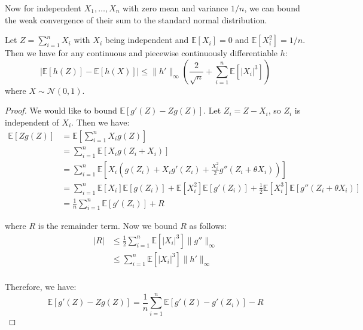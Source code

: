 \documentclass{article}
\begin{document}
Now for independent $X_1, \ldots, X_n$ with zero mean and variance $1/n$, we can bound the weak convergence of their sum to the standard normal distribution.  

\begin{theorem}
    Let $Z = \sum_{i=1}^{n} X_i$ with $X_i$ being independent and $\mathbb{E}[X_i]=0$ and $\mathbb{E}[X_i^2]=1/n$. Then we have for any continuous and piecewise continuously differentiable $h$:
    \begin{equation*}
        \left|\mathbb{E}[h(Z)] - \mathbb{E}[h(X)]\right| \leq \|h'\|_\infty \left( \frac{2}{\sqrt{n}} + \sum_{i=1}^{n} \mathbb{E}[|X_i|^3]\right)
    \end{equation*}
    where $X\sim \mathcal{N}(0,1)$.
\end{theorem}

\begin{proof}
    We would like to bound $\mathbb{E}[g'(Z)-Zg(Z)]$. Let $Z_i = Z - X_i$, so $Z_i$ is independent of $X_i$. Then we have:
    \begin{align*}
        \mathbb{E}[Zg(Z)] &= \mathbb{E}[\sum_{i=1}^{n} X_i g(Z)]\\
        &= \sum_{i=1}^{n} \mathbb{E}[X_i g(Z_i + X_i)]\\
        &= \sum_{i=1}^{n} \mathbb{E}[X_i (g(Z_i) + X_i g'(Z_i) + \frac{X_i^2}{2} g''(Z_i +\theta X_i))]\\
        &= \sum_{i=1}^{n} \mathbb{E}[X_i] \mathbb{E}[g(Z_i)] + \mathbb{E}[X_i^2] \mathbb{E}[g'(Z_i)] + \frac{1}{2} \mathbb{E}[X_i^3] \mathbb{E}[g''(Z_i +\theta X_i)]\\
        &= \frac{1}{n} \sum_{i=1}^{n} \mathbb{E}[g'(Z_i)] + R
    \end{align*}

    where $R$ is the remainder term. Now we bound $R$ as follows:
    \begin{align*}
        |R| &\leq \frac{1}{2} \sum_{i=1}^{n} \mathbb{E}[|X_i|^3] \|g''\|_\infty\\
        &\leq \sum_{i=1}^{n} \mathbb{E}[|X_i|^3] \|h'\|_\infty\\
    \end{align*}

    Therefore, we have:
    \begin{equation*}
        \mathbb{E}[g'(Z)-Zg(Z)] = \frac{1}{n} \sum_{i=1}^{n} \mathbb{E}[g'(Z) -g'(Z_i)] - R
    \end{equation*}


\end{proof}
\end{document}

